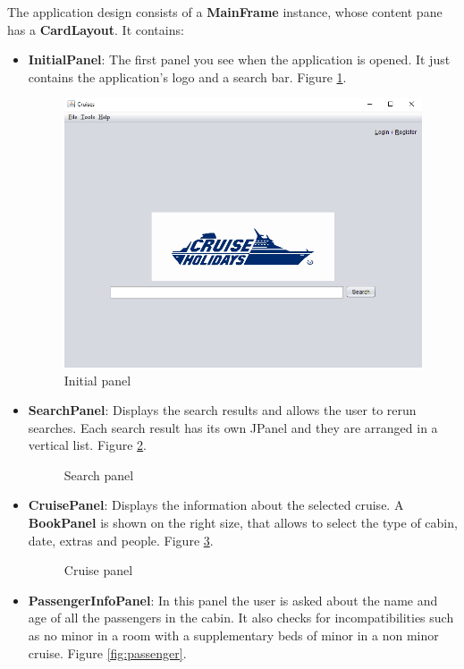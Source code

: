 \documentclass[12pt]{article}
\begin{document}
   The application design consists of a \textbf{MainFrame} instance, whose content pane has a \textbf{CardLayout}. It contains:
   \begin{itemize}
	    \item \textbf{InitialPanel}: The first panel you see when the application is opened. It just contains the application's  logo and a search bar. Figure \ref{fig:initial}.
	    \begin{figure}[h]
		   	\includegraphics[width=\linewidth]{images/initial.png}
		   	\caption{Initial panel}
		   	\label{fig:initial}
	    \end{figure}
   	    \item \textbf{SearchPanel}: Displays the search results and allows the user to rerun searches. Each search result has its own JPanel and they are arranged in a vertical list. Figure \ref{fig:search}.
   	    \begin{figure}
			\caption{Search panel}
			\label{fig:search}
   	    \end{figure}
	    \item \textbf{CruisePanel}: Displays the information about the selected cruise. A \textbf{BookPanel} is shown on the right size, that allows to select the type of cabin, date, extras and people. Figure \ref{fig:cruise}.
	    \begin{figure}
			\caption{Cruise panel}
			\label{fig:cruise}
	    \end{figure}
   	    \item \textbf{PassengerInfoPanel}: In this panel the user is asked about the name and age of all the passengers in the cabin. It also checks for incompatibilities such as no minor in a room with a supplementary beds of minor in a non minor cruise. Figure \ref{fig:passenger}.

\end{itemize}
\end{document}
